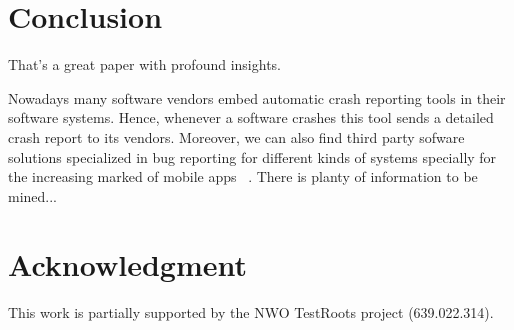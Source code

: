 \documentclass[conference]{IEEEtran}
\begin{document}
\section{Conclusion}
That's a great paper with profound insights.


Nowadays many software vendors embed automatic crash reporting tools in their software systems. Hence, whenever a software crashes this tool sends a detailed crash report to its vendors. Moreover, we can also find third party sofware solutions specialized in bug reporting for different kinds of systems specially for the increasing marked of mobile apps ~\cite{BugSe14,BugSn14,Googl14,Acra14}. There is planty of information to be mined...



\section*{Acknowledgment}
This work is partially supported by the NWO TestRoots project (639.022.314).





\end{document}
